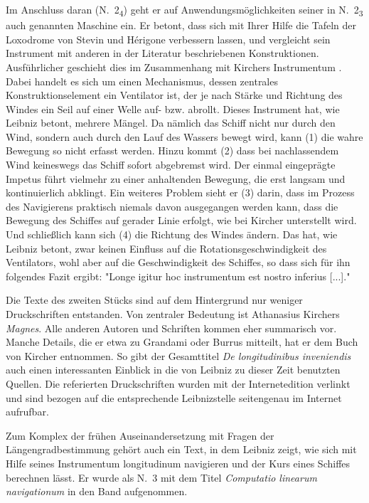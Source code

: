Im Anschluss daran (N.~2\textsubscript{4}) geht er auf Anwendungsm\"{o}glichkeiten seiner in N.~2\textsubscript{3} auch  genannten Maschine ein. Er betont, dass sich mit Ihrer Hilfe die Tafeln der Loxodrome von Stevin und H\'{e}rigone verbessern lassen, und vergleicht sein Instrument mit anderen in der Literatur beschriebenen Konstruktionen. Ausf\"{u}hrlicher geschieht dies im Zusammenhang mit Kirchers Instrumentum . Dabei handelt es sich um einen Mechanismus, dessen zentrales Konstruktionselement ein Ventilator ist, der je nach St\"{a}rke und Rich\-tung des Windes ein Seil auf einer Welle auf- bzw. abrollt. 
Dieses Instrument hat, wie Leibniz betont, mehrere M\"{a}ngel. Da n\"{a}mlich das Schiff nicht nur durch den Wind, sondern auch durch den Lauf des Wassers bewegt wird, kann (1) die wahre Bewegung so nicht erfasst werden. Hinzu kommt (2) dass bei nachlassendem Wind keines\-wegs das Schiff sofort abgebremst wird. Der einmal eingepr\"{a}gte Impetus f\"{u}hrt viel\-mehr zu einer anhaltenden Bewegung, die erst langsam und kontinuierlich abklingt. Ein weiteres Problem sieht er (3) darin, dass im Prozess des Navigierens prak\-tisch niemals davon ausgegangen werden kann, dass die Bewegung des Schiffes auf gerader Linie erfolgt, wie bei Kircher unterstellt wird. Und schlie{\ss}lich kann sich (4) die Richtung des Windes \"{a}ndern. Das hat, wie Leibniz betont, zwar keinen Einfluss auf die Rotationsgeschwindigkeit des Ventilators, wohl aber auf die Geschwindigkeit des Schiffes, so dass sich f\"{u}r ihn folgendes Fazit ergibt: "Longe igitur hoc instrumentum est nostro inferius [...]."\par
Die Texte des zweiten St\"{u}cks sind auf dem Hintergrund nur weniger Druckschriften entstanden. Von zentraler Bedeutung ist Athanasius Kirchers \textit{Magnes}. Alle anderen Autoren und Schriften kommen eher summarisch vor. Manche Details, die er etwa zu Grandami oder Burrus mitteilt, hat er dem Buch von Kircher entnommen. So gibt der Gesamttitel \textit{De longitudinibus inveniendis} auch einen interessanten Einblick in die von Leibniz zu dieser Zeit benutzten Quellen. Die referierten Druckschriften wurden mit der Internetedition verlinkt und sind bezogen auf die entsprechende Leibnizstelle seitengenau im Internet aufrufbar.\par
Zum Komplex der fr\"{u}hen Auseinandersetzung mit Fragen der L\"{a}ngengradbestimmung geh\"{o}rt auch ein Text, in dem Leibniz zeigt, wie sich mit Hilfe seines Instrumentum longitudinum navigieren und der Kurs eines Schiffes berechnen l\"{a}sst. Er wurde als N.~3 mit dem Titel \textit{Computatio linearum navigationum} in den Band aufgenommen.
